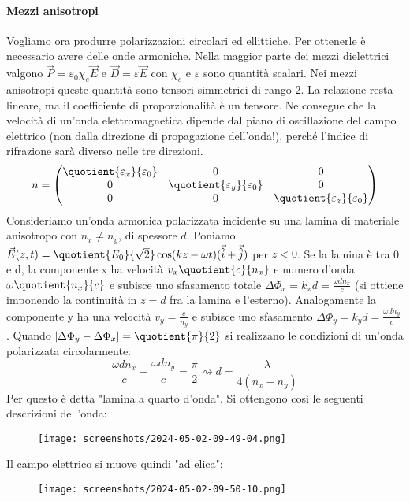 \paragraph{Mezzi anisotropi}
Vogliamo ora produrre polarizzazioni circolari ed ellittiche. Per ottenerle è necessario avere delle onde armoniche. Nella maggior parte dei mezzi dielettrici valgono \(\vec{P}= \varepsilon _0 \chi _e \vec{E}\) e \(\vec{D}= \varepsilon \vec{E}\) con \(\chi _e\) e \(\varepsilon \) sono quantità scalari. Nei mezzi anisotropi queste quantità sono tensori simmetrici di rango 2. La relazione resta lineare, ma il coefficiente di proporzionalità è un tensore. Ne consegue che la velocità di un'onda elettromagnetica dipende dal piano di oscillazione del campo elettrico (non dalla direzione di propagazione dell'onda!), perché l'indice di rifrazione sarà diverso nelle tre direzioni.
\begin{equation}
	n =
	\begin{pmatrix}
		\quotient{\varepsilon _x}{\varepsilon _0} & 0 & 0\\
		0 & \quotient{\varepsilon _y}{\varepsilon _0} & 0\\
		0 & 0 & \quotient{\varepsilon _z}{\varepsilon _0}\\   
	\end{pmatrix}
\end{equation}
Consideriamo un'onda armonica polarizzata incidente su una lamina di materiale anisotropo con \(n_x \neq n_y\), di spessore \(d\). Poniamo \(\vec{E}(z,t)=\quotient{E_0}{\sqrt{2} }  \cos (kz- \omega t)(\vec{\hat{i}} + \vec{\hat{j}})\) per \(z <0\). Se la lamina è tra 0 e d, la componente x ha velocità \(v_x \quotient{c}{n_x} \) e numero d'onda \(\omega \quotient{n_x}{c} \) e subisce uno sfasamento totale \(\Delta \Phi_x = k_x d = \frac{\omega d n_x}{c}\) (si ottiene imponendo la continuità in \(z=d\) fra la lamina e l'esterno). Analogamente la componente y ha una velocità \(v_y = \frac{c}{n_y}\) e subisce uno sfasamento \(\Delta \Phi _y = k_y d = \frac{\omega d n_y}{c}\). Quando \(\vert \Delta \Phi _y - \Delta \Phi _x \vert = \quotient{\pi }{2} \) si realizzano le condizioni di un'onda polarizzata circolarmente:
\begin{equation}
	\frac{\omega d n_x}{c} - \frac{\omega d n_y}{c} = \frac{\pi}{2} \rightsquigarrow d = \frac{\lambda }{4(n_x - n_y)}
\end{equation}
Per questo è detta "lamina a quarto d'onda".
Si ottengono così le seguenti descrizioni dell'onda:
\begin{figure}[H]
	\centering
	\texttt{[image: screenshots/2024-05-02-09-49-04.png]}
\end{figure}
Il campo elettrico si muove quindi "ad elica":
\begin{figure}[H]
	\centering
	\texttt{[image: screenshots/2024-05-02-09-50-10.png]}
\end{figure}